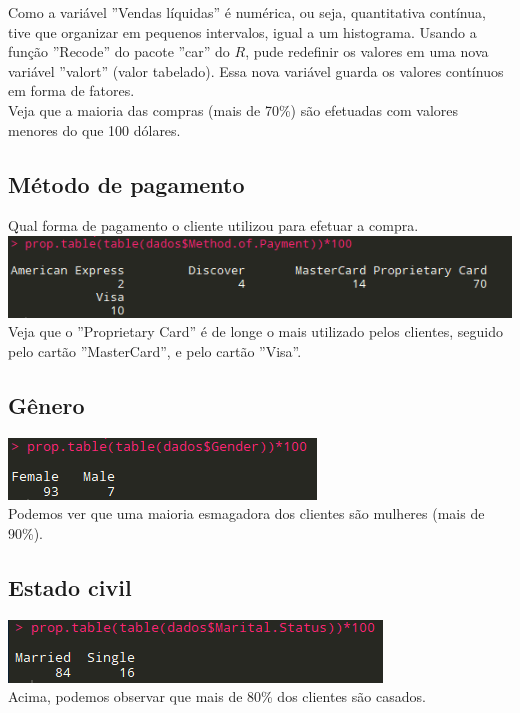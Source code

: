 \documentclass[a4paper,12pt]{article}
\begin{document}
Como a variável ''Vendas líquidas'' é numérica, ou seja, quantitativa contínua, tive que organizar em pequenos intervalos, igual a um histograma.
Usando a função ''Recode'' do pacote ''car'' do $R$, pude redefinir os valores em uma nova variável ''valort'' (valor tabelado). Essa nova variável guarda os valores contínuos em forma de fatores.\\
Veja que a maioria das compras (mais de 70\%) são efetuadas com valores menores do que 100 dólares.\\

\subsection{Método de pagamento}
Qual forma de pagamento o cliente utilizou para efetuar a compra.\\
\includegraphics[]{metodo.png}\\

Veja que o ''Proprietary Card'' é de longe o mais utilizado pelos clientes, seguido pelo cartão ''MasterCard'', e pelo cartão ''Visa''.\\

\subsection{Gênero}
\includegraphics[]{genero.png}\\

Podemos ver que uma maioria esmagadora dos clientes são mulheres (mais de 90\%).

\subsection{Estado civil}
\includegraphics[]{casamento.png}\\
Acima, podemos observar que mais de 80\% dos clientes são casados.
\end{document}
